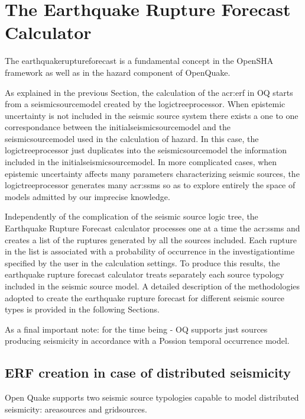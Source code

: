 %
\section{The Earthquake Rupture Forecast Calculator}
The \gls{earthquakeruptureforecast} is a fundamental concept in the OpenSHA 
framework \citep{field2003} as well as in the hazard component of OpenQuake.

As explained in the previous Section, the calculation of the \gls{acr:erf} 
in OQ starts from a \gls{seismicsourcemodel} created by the  
\gls{logictreeprocessor}.
%
When epistemic uncertainty is not included in the seismic source 
system there exists a one to one correspondance between the 
\gls{initialseismicsourcemodel} and the \gls{seismicsourcemodel} used 
in the calculation of hazard. In this case, the \gls{logictreeprocessor} 
just duplicates into the \gls{seismicsourcemodel} the information 
included in the \gls{initialseismicsourcemodel}.
%
In more complicated cases, when epistemic uncertainty affects many 
parameters characterizing seismic sources, the \gls{logictreeprocessor} 
generates many \glspl{acr:ssm} so as to explore entirely the space 
of models admitted by our imprecise knowledge.

Independently of the complication of the seismic source logic tree,
the Earthquake Rupture Forecast calculator processes one at a time the 
\glspl{acr:ssm} and creates a list of the ruptures generated by all 
the sources included. 
%
Each rupture in the list is associated with a probability of occurrence 
in the \gls{investigationtime} specified by the user in the calculation 
settings. To produce this results, the earthquake rupture forecast 
calculator treats separately each source typology included in the 
seismic source model. A detailed description of the methodologies 
adopted to create the earthquake rupture forecast for different seismic
source types is provided in the following Sections.

As a final important note: for the time being - OQ supports just sources 
producing seismicity in accordance with a Possion temporal occurrence model.
%
\subsection{ERF creation in case of distributed seismicity}
Open Quake supports two seismic source typologies capable to model 
distributed seismicity: \glspl{areasource} and \glspl{gridsource}.

